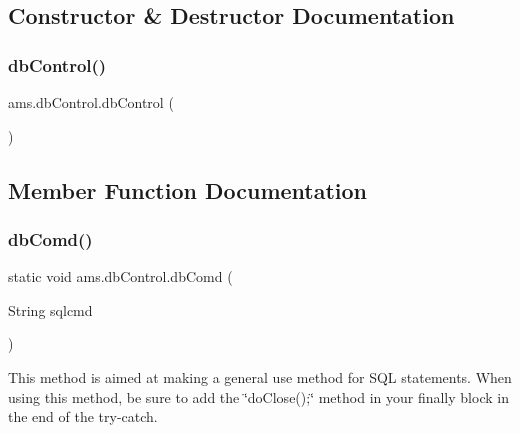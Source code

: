 \subsection{Constructor \& Destructor Documentation}
\mbox{\label{classams_1_1db_control_ad62d6afaf9e7f9fdd20b6d7c571a0de8}} 
\subsubsection{\texorpdfstring{dbControl()}{dbControl()}}
{\footnotesize\ttfamily ams.\+db\+Control.\+db\+Control (\begin{DoxyParamCaption}{ }\end{DoxyParamCaption})}



\subsection{Member Function Documentation}
\mbox{\label{classams_1_1db_control_ade10190f5f5a56dfddcfbba1de5de38c}} 
\subsubsection{\texorpdfstring{dbComd()}{dbComd()}}
{\footnotesize\ttfamily static void ams.\+db\+Control.\+db\+Comd (\begin{DoxyParamCaption}\item[{String}]{sqlcmd }\end{DoxyParamCaption})\hspace{0.3cm}{\ttfamily [static]}}

This method is aimed at making a general use method for S\+QL statements. When using this method, be sure to add the \char`\"{}do\+Close();\char`\"{} method in your finally block in the end of the try-\/catch.


